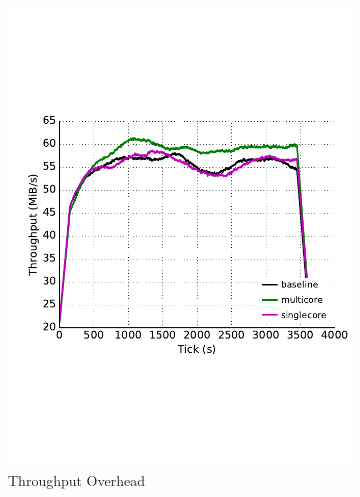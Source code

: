 \begin{figure} \centering
	\begin{subfigure}[t]{0.32\textwidth} \centering
\includegraphics[trim={0 3cm 0 3cm}, clip, width=1.0\textwidth]{images/overhead_throughput.pdf}
		\caption{Throughput Overhead}
		\label{fig:overhead_throughput}
	\end{subfigure}
	\begin{subfigure}[t]{0.32\textwidth} \centering

\end{subfigure}
\end{figure}
